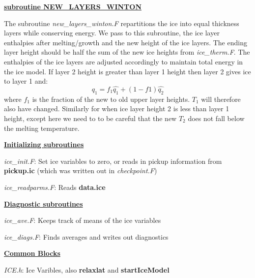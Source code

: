 
\vspace{1cm}

\noindent
{\bf {\underline{subroutine NEW\_LAYERS\_WINTON}}}

\noindent
The subroutine
{\it new\_layers\_winton.F} repartitions the ice into
equal thickness layers while conserving energy. We pass
to this subroutine, the ice layer enthalpies after
melting/growth and the new height of the ice layers.
The ending layer height should be half the sum of the
new ice heights from {\it ice\_therm.F}. The enthalpies
of the ice layers are adjusted accordingly to maintain
total energy in the ice model. If layer 2 height is
greater than layer 1 height then layer 2 gives ice to
layer 1 and:
\[
q_1=f_1 \hat{q_1} + (1-f1) \hat{q_2}
\]
where $f_1$ is the fraction of the new to old upper layer heights.
$T_1$ will therefore also have changed.
Similarly for when ice layer height 2 is less than
layer 1 height, except here we need to to be careful
that the new $T_2$ does not fall below the melting temperature.


\vspace{1cm}

\noindent
{\bf {\underline{Initializing subroutines}}}

\noindent
{\it ice\_init.F}:
Set ice variables to zero, or reads in pickup information
from {\bf pickup.ic} (which was written out in {\it checkpoint.F})

\noindent
{\it ice\_readparms.F}:
Reads {\bf data.ice}


\vspace{1cm}

\noindent
{\bf {\underline{Diagnostic subroutines}}}

\noindent
{\it ice\_ave.F}:
Keeps track of means of the ice variables

\noindent
{\it ice\_diags.F}:
Finds averages and writes out diagnostics

\vspace{1cm}

\noindent
{\bf {\underline{Common Blocks}}}

\noindent
{\it ICE.h}: Ice Varibles, also 
{\bf relaxlat} and {\bf startIceModel}

